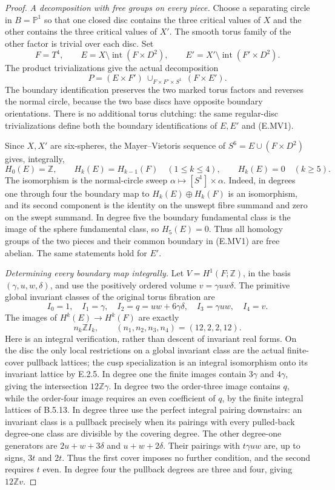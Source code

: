 \begin{proof}
\emph{A decomposition with free groups on every piece.}
Choose a separating circle in $B=\mathbb P^1$ so that one closed
disc contains the three critical values of $X$ and the other
contains the three critical values of $X'$. The smooth torus
family of the other factor is trivial over each disc. Set
\[
 F=T^4,\qquad E=X\setminus\operatorname{int}(F\times D^2),
 \qquad E'=X'\setminus\operatorname{int}(F'\times D^2).
\]
The product trivializations give the actual decomposition
\[
 P=(E\times F')\ \cup_{F\times F'\times S^1}\ (F\times E').
 \tag{E.MV1}
\]
The boundary identification preserves the two marked torus factors
and reverses the normal circle, because the two base discs have
opposite boundary orientations. There is no additional torus
clutching: the same regular-disc trivializations define both the
boundary identifications of $E,E'$ and (E.MV1).

Since $X,X'$ are six-spheres, the Mayer--Vietoris sequence of
$S^6=E\cup(F\times D^2)$ gives, integrally,
\[
 H_0(E)=\mathbb Z,\qquad H_k(E)=H_{k-1}(F)\quad(1\leq k\leq4),
 \qquad H_k(E)=0\quad(k\geq5).
 \tag{E.MV2}
\]
The isomorphism is the normal-circle sweep
$\alpha\mapsto[S^1]\times\alpha$. Indeed, in degrees one
through four the boundary map to $H_k(E)\oplus H_k(F)$ is
an isomorphism, and its second component is the identity on
the unswept fibre summand and zero on the swept summand.
In degree five the boundary fundamental class is the image
of the sphere fundamental class, so $H_5(E)=0$.
Thus all homology groups of the two pieces and their common
boundary in (E.MV1) are free abelian. The same statements hold
for $E'$.

\emph{Determining every boundary map integrally.}
Let $V=H^1(F;\mathbb Z)$, in the basis $(\gamma,u,w,\delta)$,
and use the positively ordered volume
$v=\gamma u w\delta$. The primitive global invariant classes
of the original torus fibration are
\[
 I_0=1,\quad I_1=\gamma,\quad
 I_2=q=uw+6\gamma\delta,\quad
 I_3=\gamma uw,\quad I_4=v.
\]
The images of $H^k(E)\to H^k(F)$ are exactly
\[
 n_k\mathbb Z I_k,\qquad
 (n_1,n_2,n_3,n_4)=(12,2,2,12).
 \tag{E.MV3}
\]
Here is an integral verification, rather than descent of invariant
real forms. On the disc the only local restrictions on a global
invariant class are the actual finite-cover pullback lattices;
the cusp specialization is an integral isomorphism onto its
invariant lattice by E.2.5. In degree one the finite images
contain $3\gamma$ and $4\gamma$, giving the intersection
$12\mathbb Z\gamma$. In degree two the order-three image
contains $q$, while the order-four image requires an even
coefficient of $q$, by the finite integral lattices of B.5.13.
In degree three use the perfect integral pairing downstairs:
an invariant class is a pullback precisely when its pairings
with every pulled-back degree-one class are divisible by the
covering degree. The other degree-one generators are
$2u+w+3\delta$ and $u+w+2\delta$. Their pairings with
$t\gamma uw$ are, up to signs, $3t$ and $2t$.
Thus the first cover imposes no further condition, and the
second requires $t$ even. In degree four the pullback degrees
are three and four, giving $12\mathbb Z v$.


\end{proof}

